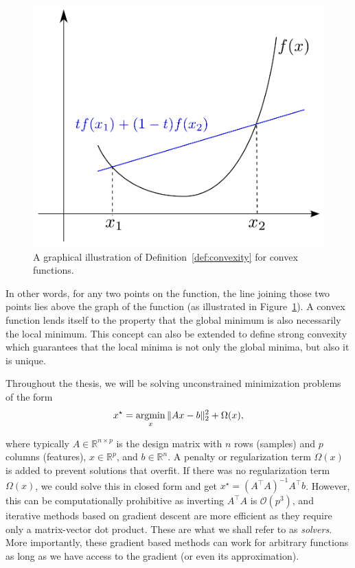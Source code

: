 \begin{figure}[htb]
\begin{center}
   \includegraphics[width=0.5\linewidth]{figures/convex_functions.pdf}
\end{center}
   \caption[Graphical illustration of convexity]{A graphical illustration of Definition~\ref{def:convexity} for convex functions.}
   \label{fig:convexity}
\end{figure}

In other words, for any two points on the function, the line joining those two points lies above the graph of the function (as illustrated in Figure~\ref{fig:convexity}). A convex function lends itself to the property that the global minimum is also necessarily the local minimum. This concept can also be extended to define strong convexity which guarantees that the local minima is not only the global minima, but also it is unique.

Throughout the thesis, we will be solving unconstrained minimization problems of the form
\begin{equation}
x^{\star} = \mathop{\mathrm{argmin}}_x \|Ax - b\|_{2}^2 + \Omega(x),
\label{eq:linreg_minimize}
\end{equation}

%
where typically $A \in \mathbb{R}^{n \times p}$ is the design matrix with $n$ rows (samples) and $p$ columns (features), $x \in \mathbb{R}^p$, and $b \in \mathbb{R}^n$. A penalty or regularization term $\Omega(x)$ is added to prevent solutions that overfit. 
If there was no regularization term $\Omega(x)$, we could solve this in closed form and get $x^{\star} = {(A^{\top}A)}^{-1}A^{\top}b$. However, this can be computationally prohibitive as inverting $A^{\top}A$ is $\mathcal{O}(p^3)$, and iterative methods based on gradient descent are more efficient as they require only a matrix-vector dot product. These are what we shall refer to as \emph{solvers}. More importantly, these gradient based methods can work for arbitrary functions as long as we have access to the gradient (or even its approximation).

